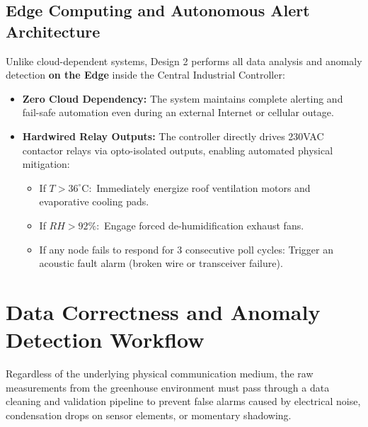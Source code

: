 \documentclass[12pt]{article}
\begin{document}
\subsection{Edge Computing and Autonomous Alert Architecture}
Unlike cloud-dependent systems, Design 2 performs all data analysis and anomaly detection \textbf{on the Edge} inside the Central Industrial Controller:
\begin{itemize}
    \item \textbf{Zero Cloud Dependency:} The system maintains complete alerting and fail-safe automation even during an external Internet or cellular outage.
    \item \textbf{Hardwired Relay Outputs:} The controller directly drives 230VAC contactor relays via opto-isolated outputs, enabling automated physical mitigation:
    \begin{itemize}
        \item If $T > 36^\circ\text{C}:$ Immediately energize roof ventilation motors and evaporative cooling pads.
        \item If $RH > 92\% :$ Engage forced de-humidification exhaust fans.
        \item If any node fails to respond for 3 consecutive poll cycles: Trigger an acoustic fault alarm (broken wire or transceiver failure).
    \end{itemize}
\end{itemize}

\section{Data Correctness and Anomaly Detection Workflow}

Regardless of the underlying physical communication medium, the raw measurements from the greenhouse environment must pass through a data cleaning and validation pipeline to prevent false alarms caused by electrical noise, condensation drops on sensor elements, or momentary shadowing.
\end{document}

